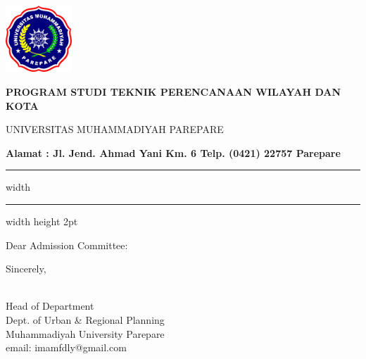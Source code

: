 \documentclass[12pt,a4paper]{lortwo}
\makeatletter
\renewcommand{\closing}[1]{
	\vspace{2.5mm} %
	\noindent %
	\hspace*{\longindentation} %
	\parbox{\indentedwidth}{
		\raggedright
		#1 %
		\vskip 1.95cm %
        \begin{spacing}{.75}

		\textbf{\fromsig} \\ %
\small Head of Department\\
\small Dept. of Urban \& Regional Planning\\
\small Muhammadiyah University Parepare\\
\small email: imamfdly@gmail.com
        \end{spacing}
	}
}
\makeatother
\begin{document}

	\begin{minipage}[b]{0.13\linewidth}
			\includegraphics[height=2.5cm]{logo2.png}
	\end{minipage}
\begin{minipage}[b]{35em}
            \Centering
            \color{red}
	\begin{spacing}{1}
\textbf{PROGRAM STUDI TEKNIK PERENCANAAN WILAYAH DAN KOTA}

UNIVERSITAS MUHAMMADIYAH PAREPARE

\textbf{Alamat : Jl. Jend. Ahmad Yani Km. 6 Telp. (0421) 22757 Parepare}
	\end{spacing}
\end{minipage}

\vspace{0.2em}%

{\color{red}\hrule width \hsize \kern 1mm \hrule width \hsize height 2pt}



\hspace*{\longindentation}\DTMtoday\hspace*{\fill}\par %

\vspace{10pt}
Dear Admission Committee:
\lipsum[2-4]

\closing{Sincerely,}
\end{document}

